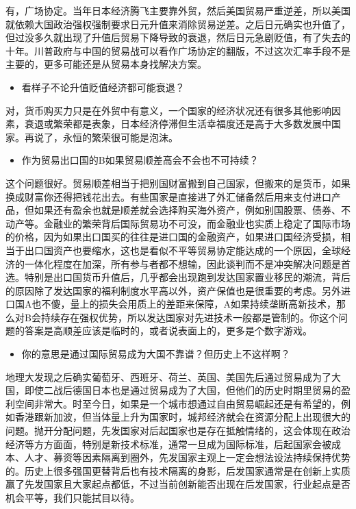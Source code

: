 \documentclass[
  letterpaper,
  DIV=11,
  numbers=noendperiod]{scrreprt}
\providecommand{\tightlist}{%
  \setlength{\itemsep}{0pt}\setlength{\parskip}{0pt}}\usepackage{longtable,booktabs,array}
\begin{document}
有，广场协定。当年日本经济腾飞主要靠外贸，然后美国贸易严重逆差，所以美国就依赖大国政治强权强制要求日元升值来消除贸易逆差。之后日元确实也升值了，但过没多久就出现了升值后贸易下降导致的衰退，然后日元急剧贬值，有了失去的十年。川普政府与中国的贸易战可以看作广场协定的翻版，不过这次汇率手段不是主要的，更多可能还是从贸易本身找解决方案。

\begin{itemize}
\tightlist
\item
  看样子不论升值贬值经济都可能衰退？
\end{itemize}

对，货币购买力只是在外贸中有意义，一个国家的经济状况还有很多其他影响因素，衰退或繁荣都是表象，日本经济停滞但生活幸福度还是高于大多数发展中国家。再说了，永恒的繁荣很可能是泡沫。

\begin{itemize}
\tightlist
\item
  作为贸易出口国的B如果贸易顺差高会不会也不可持续？
\end{itemize}

这个问题很好。贸易顺差相当于把别国财富搬到自己国家，但搬来的是货币，如果换成财富你还得把钱花出去。有些国家是直接进了外汇储备然后用来支付进口产品，但如果还有盈余也就是顺差就会选择购买海外资产，例如别国股票、债券、不动产等。金融业的繁荣背后国际贸易功不可没，而金融业也实质上稳定了国际市场的价格，因为如果出口国买的往往是进口国的金融资产，如果进口国经济受损，相当于出口国资产也要缩水，这也是看似不平等贸易协定能达成的一个原因，全球经济的一体化程度在加深，所有参与者都不想输，因此谈判而不是冲突解决问题是首选。特别是出口国货币升值后，几乎都会出现跑到发达国家置业移民的潮流，背后的原因除了发达国家的福利制度水平高以外，资产保值也是很重要的考虑。另外进口国A也不傻，量上的损失会用质上的差距来保障，A如果持续垄断高新技术，那么对B会持续存在强权优势，所以发达国家对先进技术一般都是管制的。你这个问题的答案是高顺差应该是临时的，或者说表面上的，更多是个数字游戏。

\begin{itemize}
\tightlist
\item
  你的意思是通过国际贸易成为大国不靠谱？但历史上不这样啊？
\end{itemize}

地理大发现之后确实葡萄牙、西班牙、荷兰、英国、美国先后通过贸易成为了大国，即使二战后德国日本也是通过贸易成为了大国，但他们的历史时期里贸易的盈利空间非常大。时至今日，如果是一个城市想通过自由贸易崛起还是有希望的，例如香港跟新加波，但当体量上升为国家时，城邦经济就会在资源分配上出现很大的问题。抛开分配问题，先发国家对后起国家也是存在抵触情绪的，这会体现在政治经济等方方面面，特别是新技术标准，通常一旦成为国际标准，后起国家会被成本、人才、募资等因素隔离到圈外，先发国家主观上一定会想法设法持续保持优势的。历史上很多强国更替背后也有技术隔离的身影，后发国家通常是在创新上实质赢了先发国家且大家起点都低，不过当前创新能否出现在后发国家，行业起点是否机会平等，我们只能拭目以待。
\end{document}
